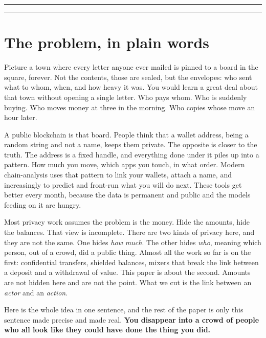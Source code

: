 \documentclass[11pt]{article}
\begin{document}
\vspace{0.5em}
{\color{rule}\hrule}
\vspace{0.3em}
{\small\tableofcontents}
\vspace{0.3em}
{\color{rule}\hrule}
\clearpage

\section{The problem, in plain words}

Picture a town where every letter anyone ever mailed is pinned to a board in the
square, forever. Not the contents, those are sealed, but the envelopes: who sent what
to whom, when, and how heavy it was. You would learn a great deal about that town
without opening a single letter. Who pays whom. Who is suddenly buying. Who moves money
at three in the morning. Who copies whose move an hour later.

A public blockchain is that board. People think that a wallet address, being a random
string and not a name, keeps them private. The opposite is closer to the truth. The
address is a fixed handle, and everything done under it piles up into a pattern. How
much you move, which apps you touch, in what order. Modern chain-analysis uses that
pattern to link your wallets, attach a name, and increasingly to predict and front-run
what you will do next. These tools get better every month, because the data is
permanent and public and the models feeding on it are hungry.

Most privacy work assumes the problem is the money. Hide the amounts, hide the
balances. That view is incomplete. There are two kinds of privacy here, and they are
not the same. One hides \emph{how much}. The other hides \emph{who}, meaning which
person, out of a crowd, did a public thing. Almost all the work so far is on the first:
confidential transfers, shielded balances, mixers that break the link between a deposit
and a withdrawal of value. This paper is about the second. Amounts are not hidden here
and are not the point. What we cut is the link between an \emph{actor} and an
\emph{action}.

\begin{intuition}
Here is the whole idea in one sentence, and the rest of the paper is only this sentence
made precise and made real. \textbf{You disappear into a crowd of people who all look
like they could have done the thing you did.}
\end{intuition}
\end{document}
